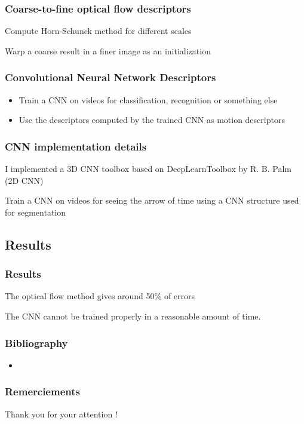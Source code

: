 \documentclass[french]{beamer}
\begin{document}
	\begin{frame}
		\frametitle{Coarse-to-fine optical flow descriptors}
		
			Compute Horn-Schunck method for different scales
			\newline
			
			Warp a coarse result in a finer image as an initialization
		
	\end{frame}
	
	
	\begin{frame}
		\frametitle{Convolutional Neural Network Descriptors}
		
		\begin{itemize}
			\item Train a CNN on videos for classification, recognition or something else
		\item Use the descriptors computed by the trained CNN as motion descriptors
		\end{itemize}
	\end{frame}
	
	\begin{frame}
		\frametitle{CNN implementation details}
		
		I implemented a 3D CNN toolbox based on DeepLearnToolbox by R. B. Palm (2D CNN)
		\newline
		
		Train a CNN on videos for seeing the arrow of time using a CNN structure used for segmentation
		
	\end{frame}
	
	\begin{frame}
		\section{Results}
		\frametitle{Results}
		
			The optical flow method gives around 50\% of errors
			\newline
			
			The CNN cannot be trained properly in a reasonable amount of time.
		
	\end{frame}
	
	\begin{frame}
		\frametitle{Bibliography}
		\begin{itemize}
			\item 
			
		\end{itemize}
		
	\end{frame}
	
	\begin{frame}
	\frametitle{Remerciements}
	
	Thank you for your attention !
	
	\end{frame}
\end{document}
